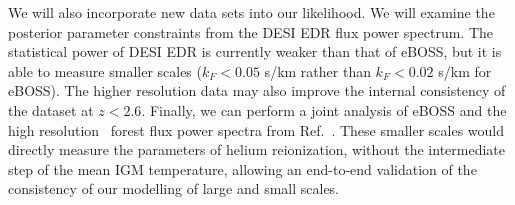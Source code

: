 We will also incorporate new data sets into our likelihood.
We will examine the posterior parameter constraints from the DESI EDR flux power spectrum.
The statistical power of DESI EDR is currently weaker than that of eBOSS, but it is able to measure smaller scales ($k_F < 0.05$ s/km rather than $k_F < 0.02$ s/km for eBOSS).
The higher resolution data may also improve the internal consistency of the dataset at $z < 2.6$.
Finally, we can perform a joint analysis of eBOSS and the high resolution \Lya~forest flux power spectra from Ref.~\cite{2022MNRAS.509.2842K}.
These smaller scales would directly measure the parameters of helium reionization, without the intermediate step of the mean IGM temperature, allowing an end-to-end validation of the consistency of our modelling of large and small scales.
